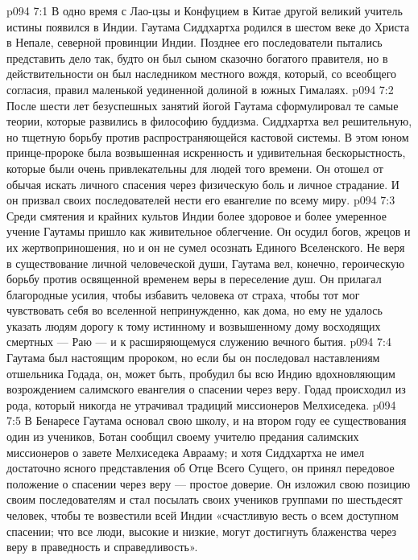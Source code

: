 \vs p094 7:1 В одно время с Лао\hyp{}цзы и Конфуцием в Китае другой великий учитель истины появился в Индии. Гаутама Сиддхартха родился в шестом веке до Христа в Непале, северной провинции Индии. Позднее его последователи пытались представить дело так, будто он был сыном сказочно богатого правителя, но в действительности он был наследником местного вождя, который, со всеобщего согласия, правил маленькой уединенной долиной в южных Гималаях.
\vs p094 7:2 После шести лет безуспешных занятий йогой Гаутама сформулировал те самые теории, которые развились в философию буддизма. Сиддхартха вел решительную, но тщетную борьбу против распространяющейся кастовой системы. В этом юном принце\hyp{}пророке была возвышенная искренность и удивительная бескорыстность, которые были очень привлекательны для людей того времени. Он отошел от обычая искать личного спасения через физическую боль и личное страдание. И он призвал своих последователей нести его евангелие по всему миру.
\vs p094 7:3 Среди смятения и крайних культов Индии более здоровое и более умеренное учение Гаутамы пришло как живительное облегчение. Он осудил богов, жрецов и их жертвоприношения, но и он не сумел осознать  Единого Вселенского. Не веря в существование личной человеческой души, Гаутама вел, конечно, героическую борьбу против освященной временем веры в переселение душ. Он прилагал благородные усилия, чтобы избавить человека от страха, чтобы тот мог чувствовать себя во вселенной непринужденно, как дома, но ему не удалось указать людям дорогу к тому истинному и возвышенному дому восходящих смертных --- Раю --- и к расширяющемуся служению вечного бытия.
\vs p094 7:4 Гаутама был настоящим пророком, но если бы он последовал наставлениям отшельника Годада, он, может быть, пробудил бы всю Индию вдохновляющим возрождением салимского евангелия о спасении через веру. Годад происходил из рода, который никогда не утрачивал традиций миссионеров Мелхиседека.
\vs p094 7:5 В Бенаресе Гаутама основал свою школу, и на втором году ее существования один из учеников, Ботан сообщил своему учителю предания салимских миссионеров о завете Мелхиседека Аврааму; и хотя Сиддхартха не имел достаточно ясного представления об Отце Всего Сущего, он принял передовое положение о спасении через веру --- простое доверие. Он изложил свою позицию своим последователям и стал посылать своих учеников группами по шестьдесят человек, чтобы те возвестили всей Индии «счастливую весть о всем доступном спасении; что все люди, высокие и низкие, могут достигнуть блаженства через веру в праведность и справедливость».

